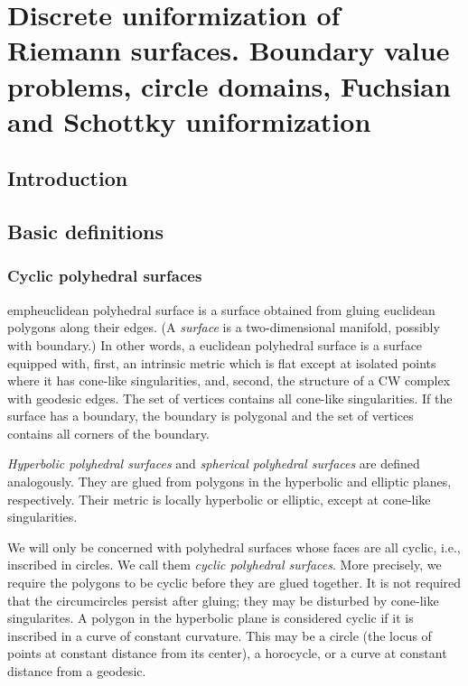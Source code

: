 \documentclass[Thesis.tex]{subfiles}
\begin{document}
\chapter{Discrete uniformization of Riemann surfaces. Boundary value problems, circle domains,
Fuchsian and Schottky uniformization}

\section{Introduction}

\section{Basic definitions}

\subsection{Cyclic polyhedral surfaces }


emph{euclidean polyhedral surface} is a surface obtained from
gluing euclidean polygons along their edges. (A \emph{surface} is a
two-dimensional manifold, possibly with boundary.)  In other words, a
euclidean polyhedral surface is a surface equipped with, first, an
intrinsic metric which is flat except at isolated points where it has
cone-like singularities, and, second, the structure of a CW complex
with geodesic edges. The set of vertices contains all cone-like
singularities. If the surface has a boundary, the boundary is
polygonal and the set of vertices contains all corners of the
boundary.

\emph{Hyperbolic polyhedral surfaces} and \emph{spherical polyhedral
surfaces} are defined analogously. They are glued from polygons in
the hyperbolic and elliptic planes, respectively. Their metric is
locally hyperbolic or elliptic, except at cone-like singularities.

We will only be concerned with polyhedral surfaces whose faces are all
cyclic, i.e., inscribed in circles. We call them \emph{cyclic
polyhedral surfaces}. More precisely, we require the polygons to be
cyclic before they are glued together. It is not required that the
circumcircles persist after gluing; they may be disturbed by cone-like
singularites. A polygon in the hyperbolic plane is considered cyclic
if it is inscribed in a curve of constant curvature. This may be a
circle (the locus of points at constant distance from its center), a
horocycle, or a curve at constant distance from a geodesic.
\end{document}
